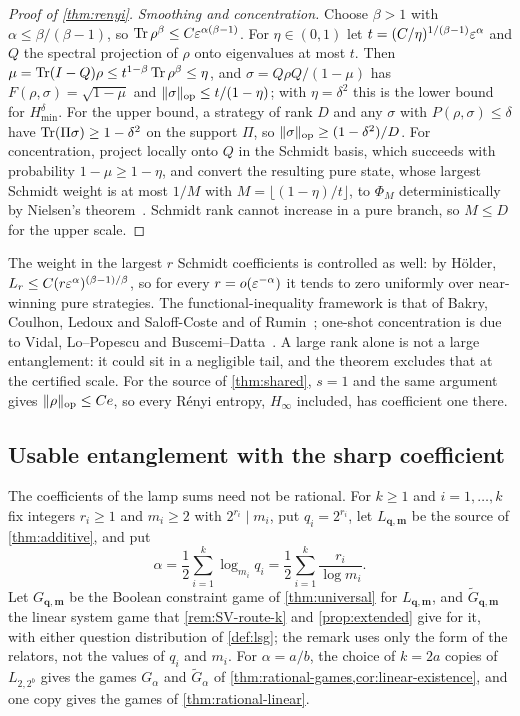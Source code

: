 \begin{proof}[Proof of \cref{thm:renyi}]
\emph{Smoothing and concentration.} Choose $\beta>1$ with $\alpha\le\beta/(\beta-1)$, so $\operatorname{Tr}\rho^\beta\le C\varepsilon^{\alpha(\beta-1)}$. For
$\eta\in(0,1)$ let $t=(C/\eta)^{1/(\beta-1)}\varepsilon^\alpha$ and $Q$ the spectral projection of $\rho$ onto eigenvalues at most $t$. Then
$\mu=\operatorname{Tr}(I-Q)\rho\le t^{1-\beta}\operatorname{Tr}\rho^\beta\le\eta$, and $\sigma=Q\rho Q/(1-\mu)$ has $F(\rho,\sigma)=\sqrt{1-\mu}$ and
$\lVert \sigma\rVert_{\mathrm{op}}\le t/(1-\eta)$; with $\eta=\delta^2$ this is the lower bound for $H^\delta_{\min}$. For the upper bound, a strategy of rank
$D$ and any $\sigma$ with $P(\rho,\sigma)\le\delta$ have $\operatorname{Tr}(\Pi\sigma)\ge1-\delta^2$ on the support $\Pi$, so $\lVert \sigma\rVert_{\mathrm{op}}\ge(1-\delta^2)/D$. For
concentration, project locally onto $Q$ in the Schmidt basis, which succeeds with probability $1-\mu\ge1-\eta$, and convert the
resulting pure state, whose largest Schmidt weight is at most $1/M$ with $M=\lfloor(1-\eta)/t\rfloor$, to $\Phi_M$ deterministically by
Nielsen's theorem~\cite{Nie99}. Schmidt rank cannot increase in a pure branch, so $M\le D$ for the upper scale.
\end{proof}

The weight in the largest $r$ Schmidt coefficients is controlled as well: by H\"older, $L_r\le C(r\varepsilon^\alpha)^{(\beta-1)/\beta}$,
so for every $r=o(\varepsilon^{-\alpha})$ it tends to zero uniformly over near-winning pure strategies. The functional-inequality
framework is that of Bakry, Coulhon, Ledoux and Saloff-Coste and of Rumin~\cite{BCLS95,Rum10}; one-shot concentration is
due to Vidal, Lo--Popescu and Buscemi--Datta~\cite{Vid99,LP01,BD10}. A large rank alone is not a large entanglement:
it could sit in a negligible tail, and the theorem excludes that at the certified scale. For the source of
\cref{thm:shared}, $s=1$ and the same argument gives $\lVert \rho\rVert_{\mathrm{op}}\le Ce$, so every R\'enyi entropy, $H_\infty$ included, has
coefficient one there.

\subsection{Usable entanglement with the sharp coefficient}\label{sec:rational-ED}

The coefficients of the lamp sums need not be rational. For $k\ge1$ and $i=1,\dots,k$ fix integers $r_i\ge1$ and $m_i\ge2$ with
$2^{r_i}\mid m_i$, put $q_i=2^{r_i}$, let $L_{\mathbf q,\mathbf m}$ be the source of \cref{thm:additive}, and put
\[
\alpha=\frac12\sum_{i=1}^k\log_{m_i}q_i=\frac12\sum_{i=1}^k\frac{r_i}{\log m_i}.
\]
Let $G_{\mathbf q,\mathbf m}$ be the Boolean constraint game of \cref{thm:universal} for $L_{\mathbf q,\mathbf m}$, and $\widetilde G_{\mathbf q,\mathbf m}$
the linear system game that \cref{rem:SV-route-k} and \cref{prop:extended} give for it, with either question distribution of
\cref{def:lsg}; the remark uses only the form of the relators, not the values of $q_i$ and $m_i$. For $\alpha=a/b$, the choice of $k=2a$ copies of $L_{2,2^b}$ gives the games $G_\alpha$ and
$\widetilde G_\alpha$ of \cref{thm:rational-games,cor:linear-existence}, and one copy gives the games of \cref{thm:rational-linear}.

